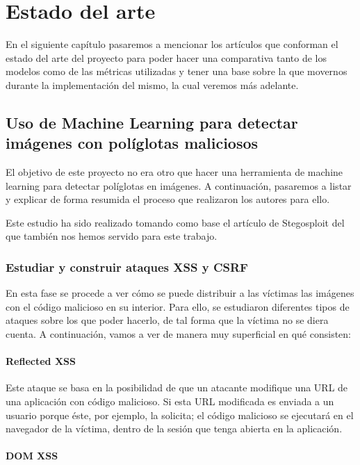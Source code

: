 \chapter{Estado del arte}
\label{ch:sota}

En el siguiente capítulo pasaremos a mencionar los artículos que conforman el estado del arte del proyecto para poder hacer una comparativa tanto de los modelos como de las métricas utilizadas y tener una base sobre la que movernos durante la implementación del mismo, la cual veremos más adelante.

\section{Uso de Machine Learning para detectar imágenes con políglotas maliciosos}


El objetivo de este proyecto no era otro que hacer una herramienta de machine learning para detectar políglotas en imágenes. A continuación, pasaremos a listar y explicar de forma resumida el proceso que realizaron los autores para ello. %

Este estudio ha sido realizado tomando como base el artículo de Stegosploit del que también nos hemos servido para este trabajo. %

\subsection{Estudiar y construir ataques XSS y CSRF}

En esta fase se procede a ver cómo se puede distribuir a las víctimas las imágenes con el código malicioso en su interior. Para ello, se estudiaron diferentes tipos de ataques sobre los que poder hacerlo, de tal forma que la víctima no se diera cuenta. A continuación, vamos a ver de manera muy superficial en qué consisten:

\subsubsection{Reflected XSS}

Este ataque se basa en la posibilidad de que un atacante modifique una URL de una aplicación con código malicioso. Si esta URL modificada es enviada a un usuario porque éste, por ejemplo, la solicita; el código malicioso se ejecutará en el navegador de la víctima, dentro de la sesión que tenga abierta en la aplicación. %

\subsubsection{DOM XSS}

